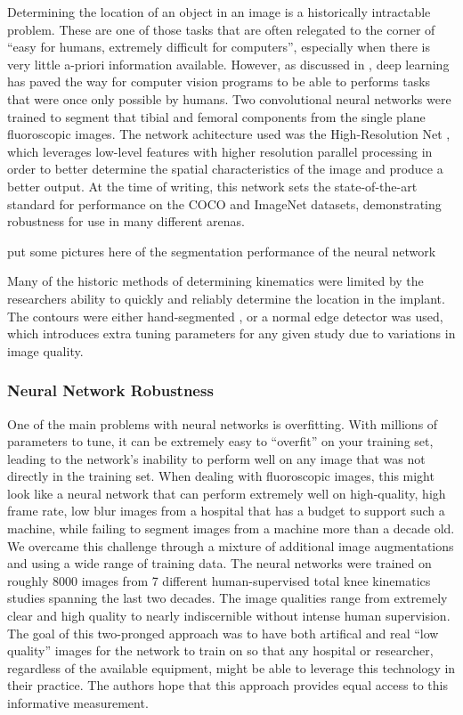 Determining the location of an object in an image is a historically intractable problem. These are one of those tasks that are often relegated to the corner of ``easy for humans, extremely difficult for computers'', especially when there is very little a-priori information available. However, as discussed in , deep learning has paved the way for computer vision programs to be able to performs tasks that were once only possible by humans. Two convolutional neural networks were trained to segment that tibial and femoral components from the single plane fluoroscopic images. The network achitecture used was the High-Resolution Net \cite{wangDeepHighResolutionRepresentation2020}, which leverages low-level features with higher resolution parallel processing in order to better determine the spatial characteristics of the image and produce a better output. At the time of writing, this network sets the state-of-the-art standard for performance on the COCO and ImageNet datasets, demonstrating robustness for use in many different arenas.

\begin{center}
    \Large{put some pictures here of the segmentation performance of the neural network}
\end{center}

Many of the historic methods of determining kinematics were limited by the researchers ability to quickly and reliably determine the location in the implant. The contours were either hand-segmented \cite{banksAccurateMeasurementThreedimensional1996, zuffiModelbasedMethodReconstruction1999}, or a normal edge detector was used, which introduces extra tuning parameters for any given study due to variations in image quality.


\subsubsection{Neural Network Robustness}
One of the main problems with neural networks is overfitting. With millions of parameters to tune, it can be extremely easy to ``overfit'' on your training set, leading to the network's inability to perform well on any image that was not directly in the training set. When dealing with fluoroscopic images, this might look like a neural network that can perform extremely well on high-quality, high frame rate, low blur images from a hospital that has a budget to support such a machine, while failing to segment images from a machine more than a decade old. We overcame this challenge through a mixture of additional image augmentations \cite{buslaevAlbumentationsFastFlexible2020} and using a wide range of training data. The neural networks were trained on roughly 8000 images from 7 different human-supervised total knee kinematics studies spanning the last two decades. The image qualities range from extremely clear and high quality to nearly indiscernible without intense human supervision. The goal of this two-pronged approach was to have both artifical and real ``low quality'' images for the network to train on so that any hospital or researcher, regardless of the available equipment, might be able to leverage this technology in their practice. The authors hope that this approach provides equal access to this informative measurement.